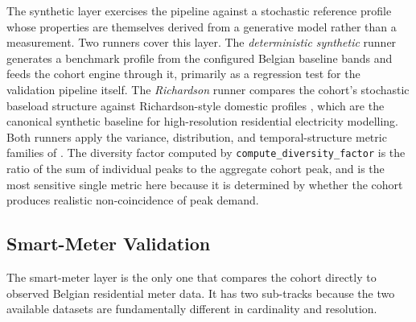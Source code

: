 The synthetic layer exercises the pipeline against a stochastic reference profile whose properties are themselves derived from a generative model rather than a measurement. Two runners cover this layer. The \textit{deterministic synthetic} runner generates a benchmark profile from the configured Belgian baseline bands and feeds the cohort engine through it, primarily as a regression test for the validation pipeline itself. The \emph{Richardson} runner compares the cohort's stochastic baseload structure against Richardson-style domestic profiles \cite{Richardson2010CRESTElectricity,Richardson2010_DomesticHighRes}, which are the canonical synthetic baseline for high-resolution residential electricity modelling. Both runners apply the variance, distribution, and temporal-structure metric families of . The diversity factor computed by \texttt{compute\_diversity\_factor} is the ratio of the sum of individual peaks to the aggregate cohort peak, and is the most sensitive single metric here because it is determined by whether the cohort produces realistic non-coincidence of peak demand.





\subsection{Smart-Meter Validation}
\label{sec:smartMeterValidation}

The smart-meter layer is the only one that compares the cohort directly to observed Belgian residential meter data. It has two sub-tracks because the two available datasets are fundamentally different in cardinality and resolution.

